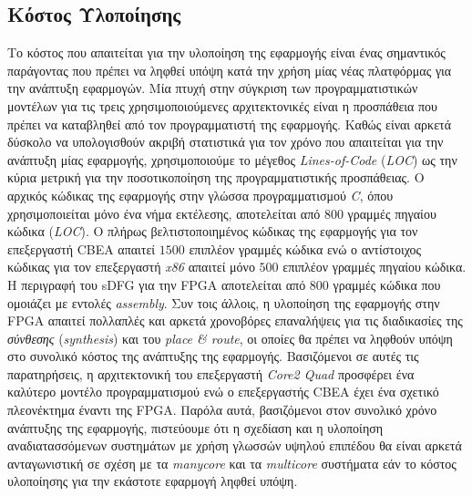 \subsection[6.2.4 Κόστος Υλοποίησης]{Κόστος Υλοποίησης}
\label{subsection:sub624}
\indent
Το κόστος που απαιτείται για την υλοποίηση της εφαρμογής είναι ένας σημαντικός παράγοντας που πρέπει να ληφθεί υπόψη κατά την χρήση μίας νέας πλατφόρμας για την ανάπτυξη εφαρμογών. Μία πτυχή στην σύγκριση των προγραμματιστικών μοντέλων για τις τρεις χρησιμοποιούμενες αρχιτεκτονικές είναι η προσπάθεια που πρέπει να καταβληθεί από τον προγραμματιστή της εφαρμογής. Καθώς είναι αρκετά δύσκολο να υπολογισθούν ακριβή στατιστικά για τον χρόνο που απαιτείται για την ανάπτυξη μίας εφαρμογής, χρησιμοποιούμε το μέγεθος \textsl{Lines-of-Code} (\textsl{LOC}) ως την κύρια μετρική για την ποσοτικοποίηση της προγραμματιστικής προσπάθειας.\newline \indent
Ο αρχικός κώδικας της εφαρμογής στην γλώσσα προγραμματισμού \textsl{C}, όπου χρησιμοποιείται μόνο ένα νήμα εκτέλεσης, αποτελείται από \(800\) γραμμές πηγαίου κώδικα (\textsl{LOC}). Ο πλήρως βελτιστοποιημένος κώδικας της εφαρμογής για τον επεξεργαστή \ac{CBEA} απαιτεί \(1500\) επιπλέον γραμμές κώδικα ενώ ο αντίστοιχος κώδικας για τον επεξεργαστή \textsl{x86} απαιτεί μόνο \(500\) επιπλέον γραμμές πηγαίου κώδικα. Η περιγραφή του \ac{sDFG} για την \ac{FPGA} αποτελείται από \(800\) γραμμές κώδικα που ομοιάζει με εντολές \textsl{assembly}. Συν τοις άλλοις, η υλοποίηση της εφαρμογής στην \ac{FPGA} απαιτεί πολλαπλές και αρκετά χρονοβόρες επαναλήψεις για τις διαδικασίες της \textsl{σύνθεσης} (\textsl{synthesis}) και του \textsl{place \& route}, οι οποίες θα πρέπει να ληφθούν υπόψη στο συνολικό κόστος της ανάπτυξης της εφαρμογής.\newline \indent
Βασιζόμενοι σε αυτές τις παρατηρήσεις, η αρχιτεκτονική του επεξεργαστή \textsl{Core2 Quad} προσφέρει ένα καλύτερο μοντέλο προγραμματισμού ενώ ο επεξεργαστής \ac{CBEA} έχει ένα σχετικό πλεονέκτημα έναντι της \ac{FPGA}. Παρόλα αυτά, βασιζόμενοι στον συνολικό χρόνο ανάπτυξης της εφαρμογής,  πιστεύουμε ότι η σχεδίαση και η υλοποίηση αναδιατασσόμενων συστημάτων με χρήση γλωσσών υψηλού επιπέδου θα είναι αρκετά ανταγωνιστική σε σχέση με τα \textsl{manycore} και τα \textsl{multicore} συστήματα εάν το κόστος υλοποίησης για την εκάστοτε εφαρμογή ληφθεί υπόψη.


